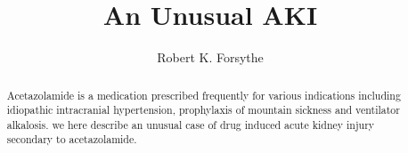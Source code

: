 \documentclass[11pt]{article}
\title{An Unusual AKI}
\author{Robert K. Forsythe}
\begin{document}
\maketitle
\begin{abstract}
Acetazolamide is a medication prescribed frequently for various indications including idiopathic intracranial hypertension, prophylaxis of mountain sickness and ventilator alkalosis. we here describe an unusual case of drug induced acute kidney injury secondary to acetazolamide. 
\end{abstract}
\end{document}
